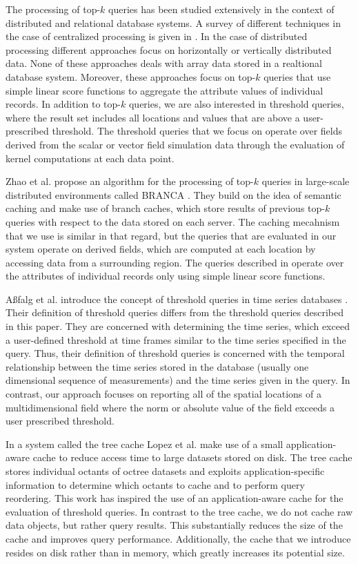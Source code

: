\documentclass{sig-alternate}
\begin{document}
The processing of top-$k$ queries has been studied extensively in the context of distributed and relational database systems. A survey of different techniques
in the case of centralized processing is given in \cite{Ilyas}. In the case of distributed processing different approaches focus on horizontally 
\cite{Balke, Vlachou} or vertically \cite{Cao, Chaudhuri, Guntzer, Marian, Michel} distributed data. None of these approaches deals with array data stored in
a realtional database system. Moreover, these approaches focus on top-$k$ queries that use simple linear score functions to aggregate the attribute values of
individual records. In addition to top-$k$ queries, we are also interested in threshold queries, where the result set includes all locations and values that are
above a user-prescribed threshold. The threshold queries that we focus on operate over fields derived from the scalar or vector field simulation data through
the evaluation of kernel computations at each data point.

Zhao et al. propose an algorithm for the processing of top-$k$ queries in large-scale distributed environments called BRANCA \cite{Zhao}. They build on the 
idea of semantic caching \cite{Ren} and make use of branch caches, which store results of previous top-$k$ queries with respect to the data stored on each server.
The caching mecahnism that we use is similar in that regard, but the queries that are evaluated in our system operate on derived fields, which are computed
at each location by accessing data from a surrounding region. The queries described in \cite{Zhao} operate over the attributes of individual records only using
simple linear score functions.

A{\ss}falg et al. introduce the concept of threshold queries in time series databases \cite{Asfalg}. Their definition of threshold queries differs from the threshold
queries described in this paper. They are concerned with determining the time series, which exceed a user-defined threshold at time frames similar to
the time series specified in the query. Thus, their definition of threshold queries is concerned with the temporal relationship between the time series
stored in the database (usually one dimensional sequence of measurements) and the time series given in the query. In contrast, our approach focuses on
reporting all of the spatial locations of a multidimensional field where the norm or absolute value of the field exceeds a user prescribed threshold.

In a system called the tree cache Lopez et al. \cite{Lopez} make use of a small application-aware cache to reduce access time to large datasets stored on
disk. The tree cache stores individual octants of octree datasets and exploits application-specific information to determine which octants to cache and to 
perform query reordering. This work has inspired the use of an application-aware cache for the evaluation of threshold queries. In contrast to the tree cache,
we do not cache raw data objects, but rather query results. This substantially reduces the size of the cache and improves query performance. Additionally, 
the cache that we introduce resides on disk rather than in memory, which greatly increases its potential size.
\end{document}
